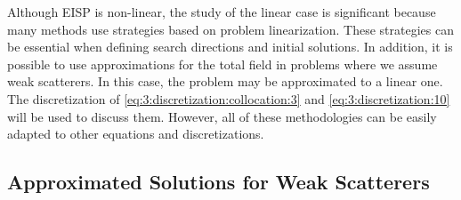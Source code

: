 		Although EISP is non-linear, the study of the linear case is significant because many methods use strategies based on problem linearization. These strategies can be essential when defining search directions and initial solutions. In addition, it is possible to use approximations for the total field in problems where we assume weak scatterers. In this case, the problem may be approximated to a linear one. The discretization of \eqref{eq:3:discretization:collocation:3} and \eqref{eq:3:discretization:10} will be used to discuss them. However, all of these methodologies can be easily adapted to other equations and discretizations.
			
		\subsection{Approximated Solutions for Weak Scatterers}\label{chap:methods:linear:weak}
				
